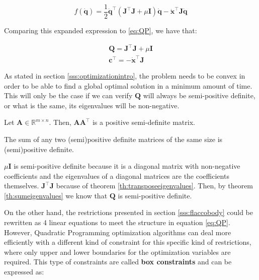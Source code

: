 \begin{equation*}
    f(\dot{\mathbf{q}}) = \frac{1}{2}\dot{\mathbf{q}}^{\top}\left(\mathbf{J}^{\top} \mathbf{J}+\mu \mathbf{I}\right) \dot{\mathbf{q}}-\dot{\mathbf{x}}^{\top} \mathbf{J} \dot{\mathbf{q}}
\end{equation*}

Comparing this expanded expression to \ref{eq:QP}, we have that:

\begin{equation*}
    \begin{array}{l}
        \mathbf{Q} = \mathbf{J}^{\top} \mathbf{J}+\mu \mathbf{I} \\
        \mathbf{c}^{\top} = -\dot{\mathbf{x}}^{\top} \mathbf{J}
    \end{array}
\end{equation*}

As stated in section \ref{sss:optimizationintro}, the problem needs to be convex in order to be able to find a global optimal solution in a minimum amount of time. This will only be the case if we can verify $\mathbf{Q}$ will always be semi-positive definite, or what is the same, its eigenvalues will be non-negative.

\begin{theorem}
    \label{th:transposeeigenvalues}
    Let $\mathbf{A} \in \mathbb{R}^{m \times n}$. Then, $\mathbf{A} \mathbf{A} ^{\top}$ is a positive semi-definite matrix.
\end{theorem}

\begin{theorem}
    \label{th:sumeigenvalues}
    The sum of any two (semi)positive definite matrices of the same size is (semi)positive definite.
\end{theorem}

$\mu \mathbf{I}$ is semi-positive definite because it is a diagonal matrix with non-negative coefficients and the eigenvalues of a diagonal matrices are the coefficients themselves. $\mathbf{J}^{\top} \mathbf{J}$ because of theorem \ref{th:transposeeigenvalues}. Then, by theorem \ref{th:sumeigenvalues} we know that $\mathbf{Q}$ is semi-positive definite.

On the other hand, the restrictions presented in section \ref{sss:flaccobody} could be rewritten as 4 linear equations to meet the structure in equation \ref{eq:QP}. However, Quadratic Programming optimization algorithms can deal more efficiently with a different kind of constraint for this specific kind of restrictions, where only upper and lower boundaries for the optimization variables are required. This type of constraints are called \textbf{box constraints} and can be expressed as:

